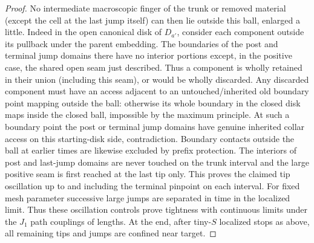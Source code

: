 \begin{proof}
No intermediate macroscopic finger of the trunk or removed material (except the cell at the last jump itself) can then lie outside this ball, enlarged a little.
Indeed in the open canonical disk of \(D_{a'}\), consider each component outside its pullback under the parent embedding.
The boundaries of the post and terminal jump domains there have no interior portions except, in the positive case, the shared open seam just described.
Thus a component is wholly retained in their union (including this seam), or would be wholly discarded.
Any discarded component must have an access adjacent to an untouched/inherited old boundary point mapping outside the ball: otherwise its whole boundary in the closed disk maps inside the closed ball, impossible by the maximum principle.
At such a boundary point the post or terminal jump domains have genuine inherited collar access on this starting-disk side, contradiction.
Boundary contacts outside the ball at earlier times are likewise excluded by prefix protection.
The interiors of post and last-jump domains are never touched on the trunk interval and the large positive seam is first reached at the last tip only.
This proves the claimed tip oscillation up to and including the terminal pinpoint on each interval.
For fixed mesh parameter successive large jumps are separated in time in the localized limit.
Thus these oscillation controls prove tightness with continuous limits under the \(J_1\) path couplings of lengths.
At the end, after tiny-\(S\) localized stops as above, all remaining tips and jumps are confined near target.


\end{proof}
